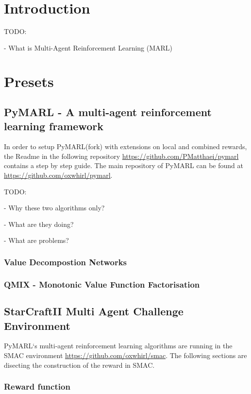 \chapter{Introduction}

TODO:

- What is Multi-Agent Reinforcement Learning (MARL)

\chapter{Presets}

\section{PyMARL - A multi-agent reinforcement learning framework}

In order to setup PyMARL(fork) with extensions on local and combined rewards, the Readme in the following repository \url{https://github.com/PMatthaei/pymarl} contains a step by step guide. The main repository of PyMARL can be found at \url{https://github.com/oxwhirl/pymarl}. \cite{samvelyan19smac}

TODO:

- Why these two algorithms only?

- What are they doing?

- What are problems?

\subsection{Value Decompostion Networks}
\subsection{QMIX - Monotonic Value Function Factorisation}

\section{StarCraftII Multi Agent Challenge Environment}

PyMARL`s multi-agent reinforcement learning algorithms are running in the SMAC environment \url{https://github.com/oxwhirl/smac}. \cite{samvelyan19smac} The following sections are disecting the construction of the reward in SMAC.

\subsection{Reward function}

